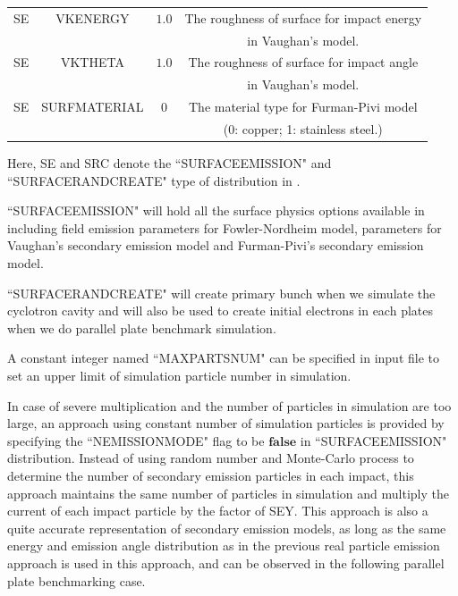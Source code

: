 \documentclass[a4paper,11pt]{article}
\begin{document}
\begin{appendices}
\begin{table}[H]
\begin{tabular}{lccc}
SE &VKENERGY& $1.0$ & The roughness of surface for impact energy\\
& & & in Vaughan's model. \\
SE &VKTHETA& $1.0$ & The roughness of surface for impact angle \\
& & &in Vaughan's model. \\  
SE &SURFMATERIAL& $0$ & The material type for Furman-Pivi model \\      
 & & &(0: copper; 1: stainless steel.) \\     
\hline %
 \hline 
   \end{tabular}
 \end{table}
Here, SE and SRC denote the ``SURFACEEMISSION" and ``SURFACERANDCREATE" type of distribution in \opal.

``SURFACEEMISSION" will hold all the surface physics options available in \opal\, including field emission parameters for Fowler-Nordheim model, parameters for Vaughan's secondary emission model and Furman-Pivi's secondary emission model. 

``SURFACERANDCREATE" will create primary bunch when we simulate the cyclotron cavity and will also be used to create initial electrons in each plates when we do parallel plate benchmark simulation. 

A constant integer named ``MAXPARTSNUM" can be specified in input file to set an upper limit of simulation particle number in simulation.
 
In case of severe multiplication and the number of particles in simulation are too large, an approach using constant number of simulation particles is provided by specifying the ``NEMISSIONMODE" flag to be $\mathbf{false}$ in ``SURFACEEMISSION" distribution. Instead of using random number and Monte-Carlo process to determine the number of secondary emission particles in each impact, this approach maintains the same number of particles in simulation and multiply the current of each impact particle by the factor of SEY. This approach is also a quite accurate representation of secondary emission models, as long as the same energy and emission angle distribution as in the previous real particle emission approach is used in this approach, and can be observed in the following parallel plate benchmarking case.


\end{appendices}
\end{document}
